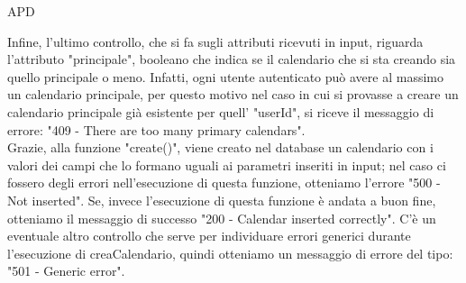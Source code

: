 \begin{listaPersonale} {APD}
\begin{listaPersonale2}[APD]{}
                Infine, l'ultimo controllo, che si fa sugli attributi ricevuti in input, riguarda l'attributo "principale", booleano che indica se il calendario che si sta creando sia quello principale o meno. Infatti, ogni utente autenticato può avere al massimo un calendario principale, per questo motivo nel caso in cui si provasse a creare un calendario principale già esistente per quell' "userId", si riceve il messaggio di errore: "409 - There are too many primary calendars". \\
                Grazie, alla funzione "create()", viene creato nel database un calendario con i valori dei campi che lo formano uguali ai parametri inseriti in input; nel caso ci fossero degli errori nell'esecuzione di questa funzione, otteniamo l'errore "500 - Not inserted". Se, invece l'esecuzione di questa funzione è andata a buon fine, otteniamo il messaggio di successo "200 - Calendar inserted correctly". C'è un eventuale altro controllo che serve per individuare errori generici durante l'esecuzione di creaCalendario, quindi otteniamo un messaggio di errore del tipo: "501 - Generic error".

\end{listaPersonale2}
\end{listaPersonale}
